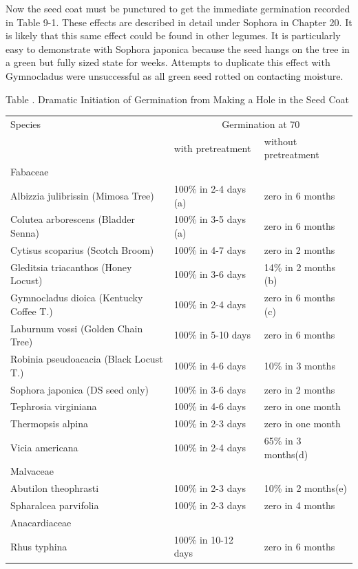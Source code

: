 Now the seed coat must be punctured to get the immediate germination recorded in
Table 9-1. These effects are described in detail under Sophora in Chapter 20. It is
likely that this same effect could be found in other legumes. It is particularly easy to
demonstrate with Sophora japonica because the seed hangs on the tree in a green
but fully sized state for weeks. Attempts to duplicate this effect with Gymnocladus were
unsuccessful as all green seed rotted on contacting moisture.

\begin{table}[h!]

\begin{center}
Table \thetable. Dramatic Initiation of Germination from Making a Hole in the Seed Coat
\end{center}

\begin{tabular}{|l|l|l|}
\hline
Species & \multicolumn{2}{|c|}{Germination at 70} \\
        & with pretreatment & without pretreatment \\
\hline
\quad Fabaceae & & \\
Albizzia julibrissin (Mimosa Tree)  & 100\% in 2-4 days (a) & zero in 6 months \\
Colutea arborescens (Bladder Senna) & 100\% in 3-5 days (a) & zero in 6 months \\
Cytisus scoparius (Scotch Broom)    & 100\% in 4-7 days     & zero in 2 months \\
Gleditsia triacanthos (Honey Locust)& 100\% in 3-6 days     & 14\% in 2 months (b) \\
Gymnocladus dioica (Kentucky Coffee T.)& 100\% in 2-4 days  & zero in 6 months (c) \\
Laburnum vossi (Golden Chain Tree)     & 100\% in 5-10 days & zero in 6 months \\
Robinia pseudoacacia (Black Locust T.) & 100\% in 4-6 days  & 10\% in 3 months \\
Sophora japonica (DS seed only)     & 100\% in 3-6 days     & zero in 2 months \\
Tephrosia virginiana                & 100\% in 4-6 days     & zero in one month \\
Thermopsis alpina                   & 100\% in 2-3 days     & zero in one month \\
Vicia americana                     & 100\% in 2-4 days     & 65\% in 3 months(d) \\
\quad Malvaceae & & \\
Abutilon theophrasti                & 100\% in 2-3 days     & 10\% in 2 months(e) \\
Spharalcea parvifolia               & 100\% in 2-3 days     & zero in 4 months \\
\quad Anacardiaceae & & \\
Rhus typhina                        & 100\% in 10-12 days   & zero in 6 months \\
\hline
\end{tabular}



\end{table}
